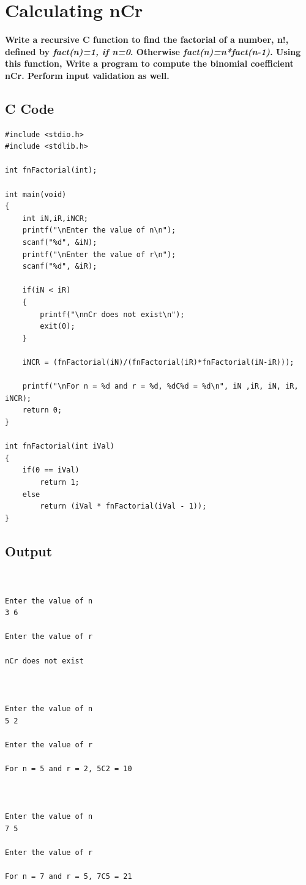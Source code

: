 \documentclass[a4paper]{report}
\begin{document}
\chapter{Calculating nCr}
{\selectfont \textbf{Write a recursive C function to find the factorial of a number, n!, defined by \textit{fact(n)=1, if n=0}. Otherwise \textit{fact(n)=n*fact(n-1)}. Using this function, Write a program to compute the binomial coefficient nCr. Perform input validation as well. 
}}
\section*{C Code}
\begin{Verbatim}
#include <stdio.h>
#include <stdlib.h>

int fnFactorial(int);

int main(void)
{
    int iN,iR,iNCR;
    printf("\nEnter the value of n\n");
    scanf("%d", &iN);
    printf("\nEnter the value of r\n");
    scanf("%d", &iR);

    if(iN < iR)
    {
        printf("\nnCr does not exist\n");
        exit(0);
    }

    iNCR = (fnFactorial(iN)/(fnFactorial(iR)*fnFactorial(iN-iR)));

    printf("\nFor n = %d and r = %d, %dC%d = %d\n", iN ,iR, iN, iR, iNCR);
    return 0;
}

int fnFactorial(int iVal)
{
    if(0 == iVal)
        return 1;
    else
        return (iVal * fnFactorial(iVal - 1));
}

\end{Verbatim}

\pagebreak
\section*{Output}
\begin{Verbatim}


Enter the value of n
3 6

Enter the value of r

nCr does not exist



Enter the value of n
5 2

Enter the value of r

For n = 5 and r = 2, 5C2 = 10



Enter the value of n
7 5

Enter the value of r

For n = 7 and r = 5, 7C5 = 21
\end{Verbatim}
\end{document}
